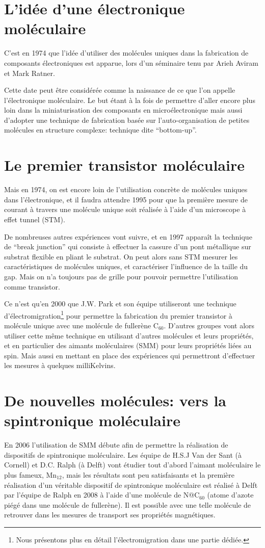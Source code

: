 \section{L'idée d'une électronique moléculaire}
C'est en 1974 que l'idée d'utiliser des molécules uniques dans la fabrication de composants électroniques est apparue, lors d'un séminaire tenu par Arieh Aviram et Mark Ratner.

Cette date peut être considérée comme la naissance de ce que l'on appelle l'électronique moléculaire.
Le but étant à la fois de permettre d'aller encore plus loin dans la miniaturisation des composants en microélectronique mais aussi d'adopter une technique de fabrication basée sur l'auto-organisation de petites molécules en structure complexe: technique dite “bottom-up”.
\section{Le premier transistor moléculaire}
Mais en 1974, on est encore loin de l'utilisation concrète de molécules uniques dans l'électronique, et il faudra attendre 1995 pour que la première mesure de courant à travers une molécule unique soit réalisée à l'aide d'un microscope à effet tunnel (STM).

De nombreuses autres expériences vont suivre, et en 1997 apparaît la technique de “break junction” qui consiste à effectuer la cassure d'un pont métallique sur substrat flexible en pliant le substrat. On peut alors sans STM mesurer les caractéristiques de molécules uniques, et caractériser l'influence de la taille du gap. Mais on n'a toujours pas de grille pour pouvoir permettre l'utilisation comme transistor.

Ce n'est qu'en 2000 que J.W. Park et son équipe utiliseront une technique d'électromigration\footnote{Nous présentons plus en détail l'électromigration dans une partie dédiée.} pour permettre la fabrication du premier transistor à molécule unique avec une molécule de fullerène C$_{60}$. D'autres groupes vont alors utiliser cette même technique en utilisant d'autres molécules et leurs propriétés, et en particulier des aimants moléculaires (SMM) pour leurs propriétés liées au spin. Mais aussi en mettant en place des expériences qui permettront d'effectuer les mesures à quelques milliKelvins.

\section{De nouvelles molécules: vers la spintronique moléculaire}
En 2006 l'utilisation de SMM débute afin de permettre la réalisation de dispositifs de spintronique moléculaire. Les équipe de H.S.J Van der Sant (à Cornell) et D.C. Ralph (à Delft) vont étudier tout d'abord l'aimant moléculaire le plus fameux, Mn$_{12}$, mais les résultats sont peu satisfaisants et la première réalisation d'un véritable dispositif de spintronique moléculaire est réalisé à Delft par l'équipe de Ralph en 2008 à l'aide d'une molécule de N@C$_{60}$ (atome d'azote piégé dans une molécule de fullerène). Il est possible avec une telle molécule de retrouver dans les mesures de transport ses propriétés magnétiques.\\

